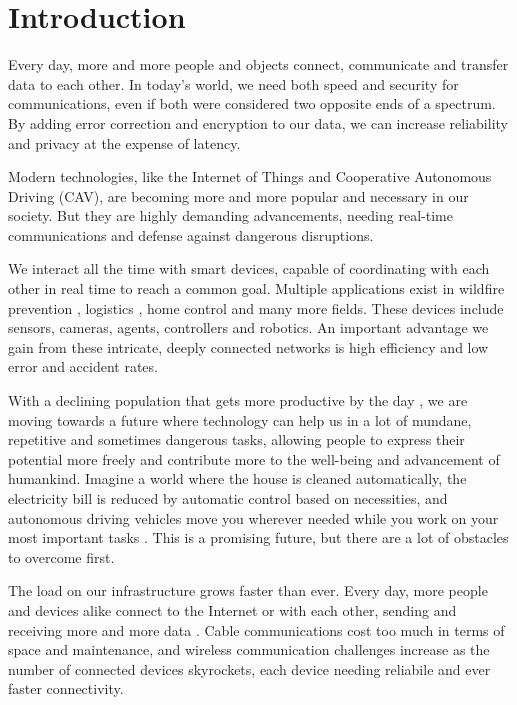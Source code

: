 \section{Introduction}

Every day, more and more people and objects connect, communicate and transfer data to each other. In today's world, we need both speed and security for communications, even if both were considered two opposite ends of a spectrum. By adding error correction and encryption to our data, we can increase reliability and privacy at the expense of latency.

Modern technologies, like the Internet of Things and Cooperative Autonomous Driving (CAV), are becoming more and more popular and necessary in our society. But they are highly demanding advancements, needing real-time communications and defense against dangerous disruptions.

We interact all the time with smart devices, capable of coordinating with each other in real time to reach a common goal. Multiple applications exist in wildfire prevention \cite{RAMADAN2024101248}, logistics \cite{Lee18042018}, home control \cite{9928254} and many more fields. These devices include sensors, cameras, agents, controllers and robotics. An important advantage we gain from these intricate, deeply connected networks is high efficiency and low error and accident rates.

With a declining population \cite{af1cfa15} that gets more productive by the day \cite{The-Productivity-Pay-Gap}, we are moving towards a future where technology can help us in a lot of mundane, repetitive and sometimes dangerous tasks, allowing people to express their potential more freely and contribute more to the well-being and advancement of humankind. Imagine a world where the house is cleaned automatically, the electricity bill is reduced by automatic control based on necessities, and autonomous driving vehicles move you wherever needed while you work on your most important tasks \cite{The-Promises-of-Automation}. This is a promising future, but there are a lot of obstacles to overcome first.

The load on our infrastructure grows faster than ever. Every day, more people and devices alike connect to the Internet or with each other, sending and receiving more and more data \cite{Cloudflare-Radar-2024-Year-in-Review}. Cable communications cost too much in terms of space and maintenance, and wireless communication challenges increase as the number of connected devices skyrockets, each device needing reliabile and ever faster connectivity.

